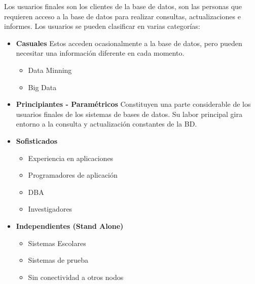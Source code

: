 \documentclass[12pt, fleqn]{report}                             %
\begin{document}
                Los usuarios finales son los clientes de la base de datos, son las personas que
                requieren acceso a la base de datos para realizar consultas, actualizaciones e
                informes. Los usuarios se pueden clasificar en varias categorías:
                \begin{itemize}
                        \item
                            \textbf{Casuales}
                            Estos acceden ocasionalmente a la base de datos, pero pueden necesitar una
                            información diferente en cada momento.

                            \begin{itemize}
                                \item Data Minning
                                \item Big Data
                            \end{itemize}

                        \item 
                            \textbf{Principiantes - Paramétricos}
                            Constituyen una parte considerable de los usuarios finales de los
                            sistemas de bases de datos. Su labor principal gira entorno a la
                            consulta y actualización constantes de la BD.

                        \item 
                            \textbf{Sofisticados}
                            \begin{itemize}
                                \item Experiencia en aplicaciones 
                                \item Programadores de aplicación
                                \item DBA 
                                \item Investigadores
                             \end{itemize}
                            
                        \item 
                            \textbf{Independientes (Stand Alone)} 
                                \begin{itemize}
                                    \item Sistemas Escolares
                                    \item Sistemas de prueba
                                    \item Sin conectividad a otros nodos
                                \end{itemize}

                \end{itemize}
\end{document}
